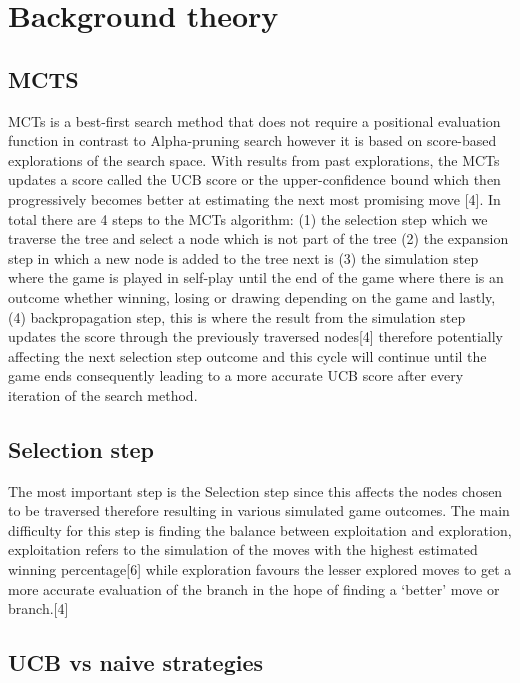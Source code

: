 \documentclass[]{final_report}
\begin{document}
\chapter{Background theory}

\section{MCTS}

MCTs is a best-first search method that does not require a positional evaluation function
in contrast to Alpha-pruning search however it is based on score-based explorations of the
search space. With results from past explorations, the MCTs updates a score called the UCB score or the upper-confidence bound which then progressively becomes better at estimating the next most promising move [4]. In total there are 4 steps to the MCTs algorithm: (1) the selection step which we traverse the tree and select a node which is not part of the tree (2) the expansion step in which a new node is added to the tree next is (3) the simulation step where the game is played in self-play until the end of the game where there is an outcome whether winning, losing or drawing depending on the game and lastly, (4) backpropagation step, this is where the result from the simulation step
updates the score through the previously traversed nodes[4] therefore potentially affecting
the next selection step outcome and this cycle will continue until the game ends consequently leading to a more accurate UCB score after every iteration of the search method. 

\section{Selection step}

The most important step is the Selection step since this affects the nodes chosen to be
traversed therefore resulting in various simulated game outcomes. The main difficulty for this
step is finding the balance between exploitation and exploration, exploitation refers to the
simulation of the moves with the highest estimated winning percentage[6] while exploration
favours the lesser explored moves to get a more accurate evaluation of the branch in the
hope of finding a ‘better’ move or branch.[4]

\section{UCB vs naive strategies}
\end{document}
